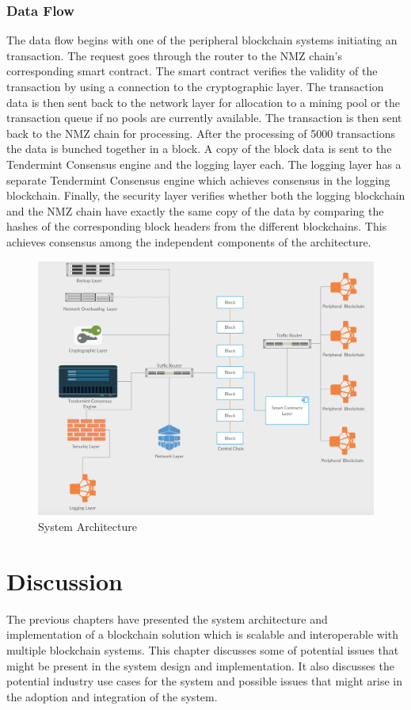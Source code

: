 \documentclass[a4paper,twoside,phd]{BYUPhys}
\begin{document}
\subsection{Data Flow}
The data flow begins with one of the peripheral blockchain systems initiating an transaction. The request goes through the router to the NMZ chain's corresponding smart contract. The smart contract verifies the validity of the transaction by using a connection to the cryptographic layer. The transaction data is then sent back to the network layer for allocation to a mining pool or the transaction queue if no pools are currently available. The transaction is then sent back to the NMZ chain for processing. After the processing of 5000 transactions the data is bunched together in a block. A copy of the block data is sent to the Tendermint Consensus engine and the logging layer each. The logging layer has a separate Tendermint Consensus engine which achieves consensus in the logging blockchain. Finally, the security layer verifies whether both the logging blockchain and the NMZ chain have exactly the same copy of the data by comparing the hashes of the corresponding block headers from the different blockchains. This achieves consensus among the independent components of the architecture.
\begin{figure}
  \includegraphics[width=\linewidth]{system_overview.png}
  \caption{System Architecture}
  \label{fig:3}
\end{figure}
\chapter{Discussion}
\label{chap:Discussion}
The previous chapters have presented the system architecture and implementation of a blockchain solution which is scalable and interoperable with multiple blockchain systems. This chapter discusses some of potential issues that might be present in the system design and implementation. It also discusses the potential industry use cases for the system and possible issues that might arise in the adoption and integration of the system.
\end{document}
